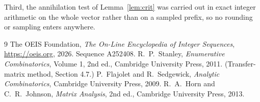 \documentclass[11pt,a4paper]{article}
\theoremstyle{plain}
\theoremstyle{definition}
\begin{document}
Third, the annihilation test of Lemma~\ref{lem:crit} was carried out in exact integer
arithmetic on the whole vector rather than on a sampled prefix, so no rounding or sampling
enters anywhere.

\begin{thebibliography}{9}
 The OEIS Foundation, \emph{The On-Line Encyclopedia of Integer
Sequences}, \url{https://oeis.org}, 2026. Sequence A252408.
 R.~P.~Stanley, \emph{Enumerative Combinatorics}, Volume 1, 2nd ed.,
Cambridge University Press, 2011. (Transfer-matrix method, Section 4.7.)
 P.~Flajolet and R.~Sedgewick, \emph{Analytic Combinatorics}, Cambridge
University Press, 2009.
 R.~A.~Horn and C.~R.~Johnson, \emph{Matrix Analysis}, 2nd ed., Cambridge
University Press, 2013.
\end{thebibliography}
\end{document}

